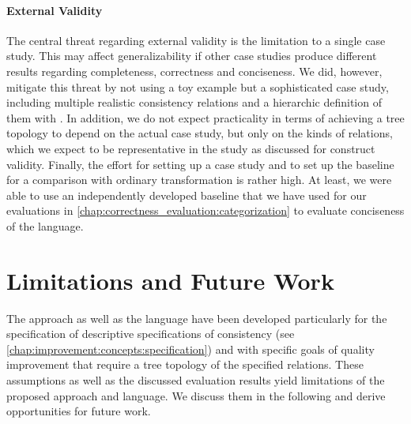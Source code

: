 \paragraph{External Validity}
The central threat regarding external validity is the limitation to a single case study.
This may affect generalizability if other case studies produce different results regarding completeness, correctness and conciseness.
We did, however, mitigate this threat by not using a toy example but a sophisticated case study, including multiple realistic consistency relations and a hierarchic definition of them with \commonalities.
In addition, we do not expect practicality in terms of achieving a tree topology to depend on the actual case study, but only on the kinds of relations, which we expect to be representative in the study as discussed for construct validity.
Finally, the effort for setting up a case study and to set up the baseline for a comparison with ordinary transformation is rather high.
At least, we were able to use an independently developed baseline that we have used for our evaluations in \autoref{chap:correctness_evaluation:categorization} to evaluate conciseness of the \commonalities language.



\section{Limitations and Future Work}

The \commonalities approach as well as the \commonalities language have been developed particularly for the specification of descriptive specifications of consistency (see \autoref{chap:improvement:concepts:specification}) and with specific goals of quality improvement that require a tree topology of the specified relations.
These assumptions as well as the discussed evaluation results yield limitations of the proposed approach and language.
We discuss them in the following and derive opportunities for future work.

